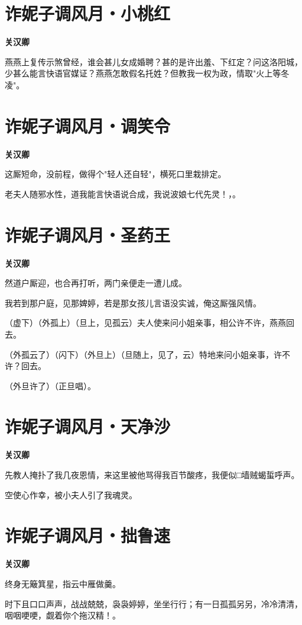 \documentclass[12pt,a4paper]{ctexbook}
\begin{document}
\section{诈妮子调风月・小桃红}
\textbf{关汉卿}\par\vspace{0.5em}
燕燕上复传示煞曾经，谁会甚儿女成婚聘？甚的是许出羞、下红定？问这洛阳城，少甚么能言快语官媒证？燕燕怎敢假名托姓？但教我一权为政，情取"火上等冬凌"。\par

\section{诈妮子调风月・调笑令}
\textbf{关汉卿}\par\vspace{0.5em}
这厮短命，没前程，做得个"轻人还自轻"，横死口里栽排定。\par
老夫人随邪水性，道我能言快语说合成，我说波娘七代先灵！，。\par

\section{诈妮子调风月・圣药王}
\textbf{关汉卿}\par\vspace{0.5em}
然道户厮迎，也合再打听，两门亲便走一遭儿成。\par
我若到那户庭，见那婢婷，若是那女孩儿言语没实诚，俺这厮强风情。\par
（虚下）（外孤上）（旦上，见孤云）夫人使来问小姐亲事，相公许不许，燕燕回去。\par
（外孤云了）（闪下）（外旦上）（旦随上，见了，云）特地来问小姐亲事，许不许？回去。\par
（外旦许了）（正旦唱）。\par

\section{诈妮子调风月・天净沙}
\textbf{关汉卿}\par\vspace{0.5em}
先教人掩扑了我几夜恩情，来这里被他骂得我百节酸疼，我便似□墙贼蝎蜇呼声。\par
空使心作幸，被小夫人引了我魂灵。\par

\section{诈妮子调风月・拙鲁速}
\textbf{关汉卿}\par\vspace{0.5em}
终身无簸箕星，指云中雁做羹。\par
时下且口口声声，战战兢兢，袅袅婷婷，坐坐行行；有一日孤孤另另，冷冷清清，咽咽哽哽，觑着你个拖汉精！。\par
\end{document}
